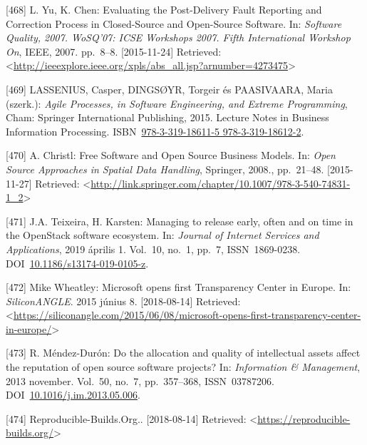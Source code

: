 \documentclass[12pt,magyar,a4paper,oneside]{scrreprt}
\newenvironment{cslreferences}%
  {}%
  {\par}
\begin{document}
\begin{cslreferences}
\leavevmode\hypertarget{ref-yu_evaluating_2007}{}%
{[}468{]} L. Yu, K. Chen: Evaluating the Post-Delivery Fault Reporting
and Correction Process in Closed-Source and Open-Source Software. In:
\emph{Software Quality, 2007. WoSQ'07: ICSE Workshops 2007. Fifth
International Workshop On}, IEEE, 2007. pp.~8--8. {[}2015-11-24{]}
Retrieved:
\textless{}\url{http://ieeexplore.ieee.org/xpls/abs_all.jsp?arnumber=4273475}\textgreater{}

\leavevmode\hypertarget{ref-lassenius_agile_2015}{}%
{[}469{]} LASSENIUS, Casper, DINGSØYR, Torgeir és PAASIVAARA, Maria
(szerk.): \emph{Agile Processes, in Software Engineering, and Extreme
Programming}, Cham: Springer International Publishing, 2015. Lecture
Notes in Business Information Processing.
ISBN~\href{https://worldcat.org/isbn/978-3-319-18611-5\%20978-3-319-18612-2}{978-3-319-18611-5 978-3-319-18612-2}.

\leavevmode\hypertarget{ref-christl_free_2008}{}%
{[}470{]} A. Christl: Free Software and Open Source Business Models. In:
\emph{Open Source Approaches in Spatial Data Handling}, Springer, 2008.,
pp.~21--48. {[}2015-11-27{]} Retrieved:
\textless{}\url{http://link.springer.com/chapter/10.1007/978-3-540-74831-1_2}\textgreater{}

\leavevmode\hypertarget{ref-teixeira_managing_2019}{}%
{[}471{]} J.A. Teixeira, H. Karsten: Managing to release early, often
and on time in the OpenStack software ecosystem. In: \emph{Journal of
Internet Services and Applications}, 2019 április 1. Vol.~10, no.~1,
pp.~7, ISSN~1869-0238.
DOI~\href{https://doi.org/10.1186/s13174-019-0105-z}{10.1186/s13174-019-0105-z}.

\leavevmode\hypertarget{ref-mike_wheatley_microsoft_2015}{}%
{[}472{]} Mike Wheatley: Microsoft opens first Transparency Center in
Europe. In: \emph{SiliconANGLE}. 2015 június 8. {[}2018-08-14{]}
Retrieved:
\textless{}\url{https://siliconangle.com/2015/06/08/microsoft-opens-first-transparency-center-in-europe/}\textgreater{}

\leavevmode\hypertarget{ref-mendez-duron_allocation_2013}{}%
{[}473{]} R. Méndez-Durón: Do the allocation and quality of intellectual
assets affect the reputation of open source software projects? In:
\emph{Information \& Management}, 2013 november. Vol.~50, no.~7,
pp.~357--368, ISSN~03787206.
DOI~\href{https://doi.org/10.1016/j.im.2013.05.006}{10.1016/j.im.2013.05.006}.

\leavevmode\hypertarget{ref-noauthor_reproducible-builds.org_nodate}{}%
{[}474{]} Reproducible-Builds.Org.. {[}2018-08-14{]} Retrieved:
\textless{}\url{https://reproducible-builds.org/}\textgreater{}


\end{cslreferences}
\end{document}
